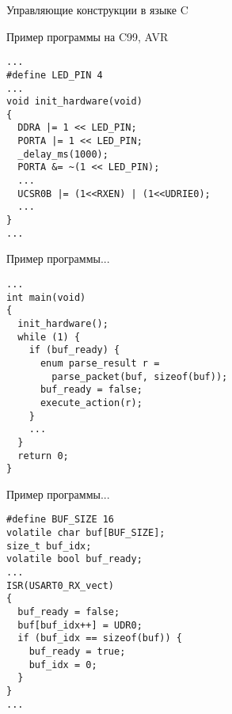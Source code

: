 \documentclass[t]{beamer}
\renewcommand{\emph}[1]{{\color{blue} #1}}
\begin{document}
\begin{frame}{Управляющие конструкции в языке C}
\end{frame}

\begin{frame}[fragile]{Пример программы на C99, AVR}
\begin{lstlisting}
...
#define LED_PIN 4
...
void init_hardware(void)
{
  DDRA |= 1 << LED_PIN;
  PORTA |= 1 << LED_PIN;
  _delay_ms(1000);
  PORTA &= ~(1 << LED_PIN);
  ...
  UCSR0B |= (1<<RXEN) | (1<<UDRIE0);
  ...
}
...
\end{lstlisting}
\end{frame}

\begin{frame}[fragile]{Пример программы...}
\begin{lstlisting}
...
int main(void)
{
  init_hardware();
  while (1) {
    if (buf_ready) {
      enum parse_result r =
        parse_packet(buf, sizeof(buf));
      buf_ready = false;
      execute_action(r);
    }
    ...
  }
  return 0;
}
\end{lstlisting}
\end{frame}

\begin{frame}[fragile]{Пример программы...}
\begin{lstlisting}
#define BUF_SIZE 16
volatile char buf[BUF_SIZE];
size_t buf_idx;
volatile bool buf_ready;
...
ISR(USART0_RX_vect)
{
  buf_ready = false;
  buf[buf_idx++] = UDR0;
  if (buf_idx == sizeof(buf)) {
    buf_ready = true;
    buf_idx = 0;
  }
}
...
\end{lstlisting}
\end{frame}
\end{document}
